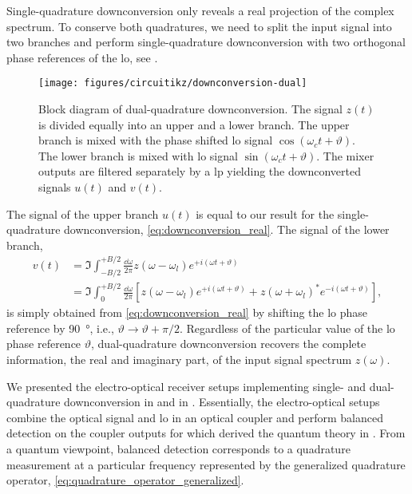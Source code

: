 Single-quadrature downconversion only reveals a real projection of the complex spectrum.
To conserve both quadratures, we need to split the input signal into two branches and perform single-quadrature downconversion with two orthogonal phase references of the \gls{lo}, see .
\begin{figure}[htb]
	\centering
	\texttt{[image: figures/circuitikz/downconversion-dual]}
	\caption{Block diagram of dual-quadrature downconversion. The signal $z(t)$ is divided equally into an upper and a lower branch. The upper branch is mixed with the phase shifted \gls{lo} signal $\cos(\omega_ct+\vartheta)$. The lower branch is mixed with \gls{lo} signal $\sin(\omega_ct+\vartheta)$. The mixer outputs are filtered separately by a \gls{lp} yielding the downconverted signals $u(t)$ and $v(t)$.}\label{fig:downconversion_dual}
\end{figure}
The signal of the upper branch $u(t)$ is equal to our result for the single-quadrature downconversion, \cref{eq:downconversion_real}.
The signal of the lower branch,
\begin{equation}
	\begin{split}
		v(t)
		&=
		\Im
		\int_{-B/2}^{+B/2}\frac{\dd{\omega}}{2\pi}
		z(\omega-\omega_l)
		e^{+i(\omega t+\vartheta)}
		\\
		&=
		\Im
		\int_{0}^{+B/2}\frac{\dd{\omega}}{2\pi}
		\left[
			z(\omega-\omega_l)
			e^{+i(\omega t+\vartheta)}
			+
			z(\omega+\omega_l)^*
			e^{-i(\omega t+\vartheta)}
		\right]
		,
	\end{split}
	\label{eq:downconversion_imag}	
\end{equation}
is simply obtained from \cref{eq:downconversion_real} by shifting the \gls{lo} phase reference by \SI{90}{\degree}, i.e., $\vartheta\to\vartheta+\pi/2$.
Regardless of the particular value of the \gls{lo} phase reference $\vartheta$, dual-quadrature downconversion recovers the complete information, the real and imaginary part, of the input signal spectrum $z(\omega)$.

We presented the electro-optical receiver setups implementing single- and dual-quadrature downconversion in  and  in .
Essentially, the electro-optical setups combine the optical signal and \gls{lo} in an optical coupler and perform balanced detection on the coupler outputs for which derived the quantum theory in .
From a quantum viewpoint, balanced detection corresponds to a quadrature measurement at a particular frequency represented by the generalized quadrature operator, \cref{eq:quadrature_operator_generalized}.

